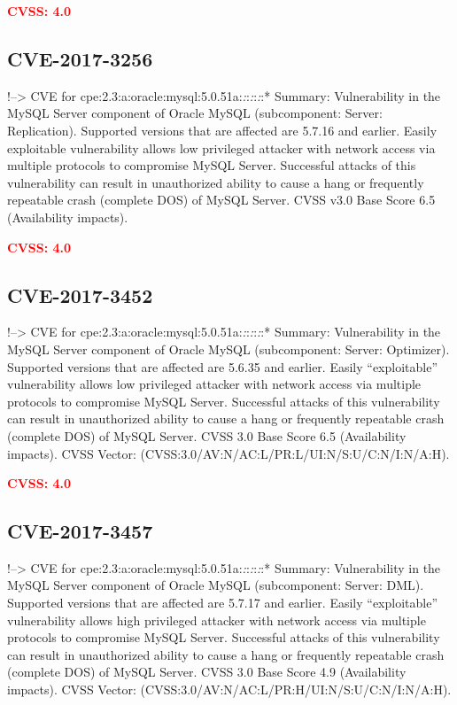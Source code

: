 \documentclass[a4paper, 12pt]{article}
\begin{document}
\textbf{\textcolor{red}{CVSS: 4.0}}

\hypertarget{cve-2017-3256}{%
\subsection{CVE-2017-3256}\label{cve-2017-3256}}

!--\textgreater{} CVE for
cpe:2.3:a:oracle:mysql:5.0.51a:\emph{:}:\emph{:}:\emph{:}:* Summary:
Vulnerability in the MySQL Server component of Oracle MySQL
(subcomponent: Server: Replication). Supported versions that are
affected are 5.7.16 and earlier. Easily exploitable vulnerability allows
low privileged attacker with network access via multiple protocols to
compromise MySQL Server. Successful attacks of this vulnerability can
result in unauthorized ability to cause a hang or frequently repeatable
crash (complete DOS) of MySQL Server. CVSS v3.0 Base Score 6.5
(Availability impacts).

\textbf{\textcolor{red}{CVSS: 4.0}}

\hypertarget{cve-2017-3452}{%
\subsection{CVE-2017-3452}\label{cve-2017-3452}}

!--\textgreater{} CVE for
cpe:2.3:a:oracle:mysql:5.0.51a:\emph{:}:\emph{:}:\emph{:}:* Summary:
Vulnerability in the MySQL Server component of Oracle MySQL
(subcomponent: Server: Optimizer). Supported versions that are affected
are 5.6.35 and earlier. Easily ``exploitable'' vulnerability allows low
privileged attacker with network access via multiple protocols to
compromise MySQL Server. Successful attacks of this vulnerability can
result in unauthorized ability to cause a hang or frequently repeatable
crash (complete DOS) of MySQL Server. CVSS 3.0 Base Score 6.5
(Availability impacts). CVSS Vector:
(CVSS:3.0/AV:N/AC:L/PR:L/UI:N/S:U/C:N/I:N/A:H).

\textbf{\textcolor{red}{CVSS: 4.0}}

\hypertarget{cve-2017-3457}{%
\subsection{CVE-2017-3457}\label{cve-2017-3457}}

!--\textgreater{} CVE for
cpe:2.3:a:oracle:mysql:5.0.51a:\emph{:}:\emph{:}:\emph{:}:* Summary:
Vulnerability in the MySQL Server component of Oracle MySQL
(subcomponent: Server: DML). Supported versions that are affected are
5.7.17 and earlier. Easily ``exploitable'' vulnerability allows high
privileged attacker with network access via multiple protocols to
compromise MySQL Server. Successful attacks of this vulnerability can
result in unauthorized ability to cause a hang or frequently repeatable
crash (complete DOS) of MySQL Server. CVSS 3.0 Base Score 4.9
(Availability impacts). CVSS Vector:
(CVSS:3.0/AV:N/AC:L/PR:H/UI:N/S:U/C:N/I:N/A:H).
\end{document}
